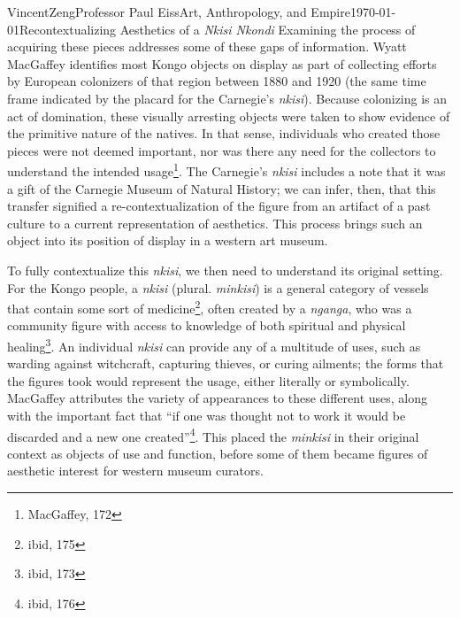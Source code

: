 \documentclass[12pt]{article}
\begin{document}
\begin{mla}{Vincent}{Zeng}{Professor Paul Eiss}{Art, Anthropology, and
    Empire}{\today}{Recontextualizing Aesthetics of a \textit{Nkisi Nkondi}}
Examining the process of acquiring these pieces addresses some of these gaps of
information. Wyatt MacGaffey identifies most Kongo objects on display as part of
collecting efforts by European colonizers of that region between 1880 and
1920 (the same time frame indicated by the placard for the Carnegie's
\textit{nkisi}). Because colonizing is an act of domination, these visually
arresting objects were taken to show evidence of the primitive nature of the
natives. In that sense, individuals who created those pieces were not deemed
important, nor was there any need for the collectors to understand the intended
usage\footnote{MacGaffey, 172}. The Carnegie's \textit{nkisi} includes a note
that it was a gift of the Carnegie Museum of Natural History; we can infer,
then, that this transfer signified a re-contextualization of the figure from an
artifact of a past culture to a current representation of aesthetics. This
process brings such an object into its position of display in a western
art museum.

To fully contextualize this \textit{nkisi}, we then need to understand its
original setting. For the Kongo people, a \textit{nkisi} (plural.
\textit{minkisi}) is a general category of vessels that contain some sort of
medicine\footnote{ibid, 175}, often created by a \textit{nganga}, who was a
community figure with access to knowledge of both spiritual and physical
healing\footnote{ibid, 173}. An individual \textit{nkisi} can provide any of a
multitude of uses, such as warding against witchcraft, capturing thieves, or
curing ailments; the forms that the figures took would represent the usage,
either literally or symbolically. MacGaffey attributes the variety of
appearances to these different uses, along with the important fact that ``if one
was thought not to work it would be discarded and a new one
created''\footnote{ibid, 176}. This placed the \textit{minkisi} in their
original context as objects of use and function, before some of them became
figures of aesthetic interest for western museum curators.


\end{mla}
\end{document}
